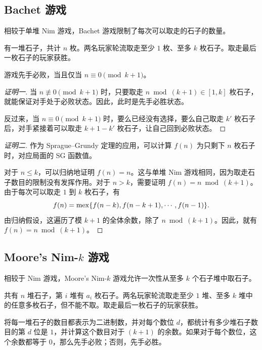 \newpage

\subsection{Bachet 游戏}

相较于单堆 Nim 游戏，Bachet 游戏限制了每次可以取走的石子的数量。

\begin{game}[Bachet]
	有一堆石子，共计 $n$ 枚。两名玩家轮流取走至少 $1$ 枚、至多 $k$ 枚石子。取走最后一枚石子的玩家获胜。
\end{game}

\begin{theorem}
	游戏先手必败，当且仅当 $n\equiv 0\pmod {k+1}$。
\end{theorem}

\begin{proof}[证明一]
	当 $n\not\equiv 0\pmod {k+1}$ 时，只要取走 $n\bmod{(k+1)}\in[1,k]$ 枚石子，就能保证对手处于必败状态。因此，此时是先手必胜状态。
	
	反过来，当 $n\equiv 0\pmod {k+1}$ 时，要么已经没有选择，要么自己取走 $k'$ 枚石子后，对手紧接着可以取走 $k+1-k'$ 枚石子，让自己回到必败状态。
\end{proof}

\begin{proof}[证明二]
	作为 Sprague--Grundy 定理的应用，可以计算 $f(n)$ 为只剩下 $n$ 枚石子时，对应局面的 SG 函数值。
	
	对于 $n\le k$，可以归纳地证明 $f(n)=n$。这与单堆 Nim 游戏相同，因为取走石子数目的限制没有发挥作用。对于 $n>k$，需要证明 $f(n)=n\bmod{(k+1)}$。由于每次可以取走 $1$ 到 $k$ 枚石子，有
	$$
	f(n) = \operatorname{mex}\{f(n-k),f(n-k+1),\cdots,f(n-1)\}.
	$$
	由归纳假设，这遍历了模 $k+1$ 的全体余数，除了 $n\bmod{(k+1)}$。因此，就有 $f(n) = n\bmod{(k+1)}$。
\end{proof}

\subsection{Moore's Nim-$k$ 游戏}

相较于 Nim 游戏，Moore's Nim-$k$ 游戏允许一次性从至多 $k$ 个石子堆中取石子。

\begin{game}
	共有 $n$ 堆石子，第 $i$ 堆有 $a_i$ 枚石子。两名玩家轮流取走至少 $1$ 堆、至多 $k$ 堆中的任意多枚石子，但不能不取。取走最后一枚石子的玩家获胜。
\end{game}

\begin{theorem}
	将每一堆石子的数目都表示为二进制数，并对每个数位 $d$，都统计有多少堆石子数目的第 $d$ 位是 $1$，并计算这个数目对于 $(k+1)$ 的余数。如果对于每个数位，这个余数都等于 $0$，那么先手必败；否则，先手必胜。
\end{theorem}

